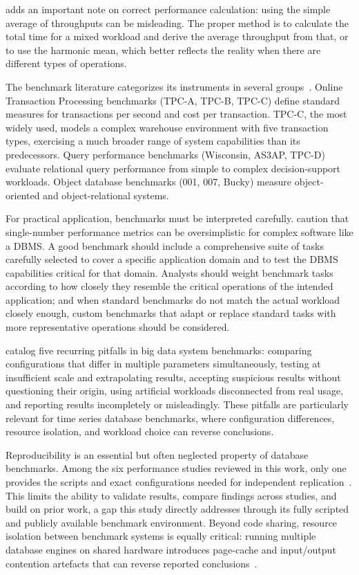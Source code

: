 \cite{Silberschatz2020} adds an important note on correct performance calculation: using
the simple average of throughputs can be misleading. The proper method is to calculate the
total time for a mixed workload and derive the average throughput from that, or to use the
harmonic mean, which better reflects the reality when there are different types of operations.

The benchmark literature categorizes its instruments in several groups~\citep{Ramakrishnan2003}.
Online Transaction Processing benchmarks (TPC-A, TPC-B, TPC-C) define standard
measures for transactions per second and cost per transaction. TPC-C, the most widely used,
models a complex warehouse environment with five transaction types, exercising a much broader
range of system capabilities than its predecessors. Query performance benchmarks
(Wisconsin, AS3AP, TPC-D) evaluate relational query performance from simple to complex
decision-support workloads. Object database benchmarks (001, 007, Bucky) measure
object-oriented and object-relational systems.

For practical application, benchmarks must be interpreted carefully.
\cite{Ramakrishnan2003} caution that single-number performance metrics can be oversimplistic
for complex software like a DBMS. A good benchmark should include a comprehensive suite of
tasks carefully selected to cover a specific application domain and to test the DBMS capabilities
critical for that domain. Analysts should weight benchmark tasks according to how closely they
resemble the critical operations of the intended application; and when standard benchmarks
do not match the actual workload closely enough, custom benchmarks that adapt or replace
standard tasks with more representative operations should be considered.

\cite{shapira2016pitfalls} catalog five recurring pitfalls in big data system benchmarks:
comparing configurations that differ in multiple parameters simultaneously, testing at
insufficient scale and extrapolating results, accepting suspicious results without questioning
their origin, using artificial workloads disconnected from real usage, and reporting results
incompletely or misleadingly. These pitfalls are particularly relevant for time series database
benchmarks, where configuration differences, resource isolation, and workload choice can
reverse conclusions.

Reproducibility is an essential but often neglected property of database benchmarks.
Among the six performance studies reviewed in this work, only one provides the scripts
and exact configurations needed for independent
replication~\citep{pereira2023mulletbench}. This limits the ability to validate results,
compare findings across studies, and build on prior work, a gap this study directly
addresses through its fully scripted and publicly available benchmark environment.
Beyond code sharing, resource isolation between benchmark systems is equally critical:
running multiple database engines on shared hardware introduces page-cache and input/output
contention artefacts that can reverse reported conclusions~\citep{shapira2016pitfalls}.
